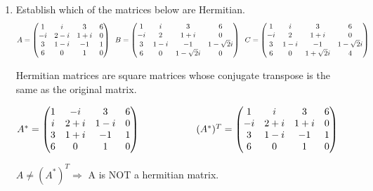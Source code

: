 \documentclass[fleqn]{article}
\begin{document}
\begin{enumerate}
    \item Establish which of the matrices below are Hermitian. $$A = 
      \begin{pmatrix}
        1 & i & 3 & 6 \\
        -i & 2-i & 1+i  & 0 \\
        3 & 1-i & -1 & 1 \\
        6 & 0 & 1 & 0 \\
      \end{pmatrix}\hskip 0.2truecm 
      B=\begin{pmatrix}
        1 & i & 3 & 6 \\
        -i & 2 & 1+i  & 0 \\
        3 & 1-i & -1 & 1-\sqrt{2}i \\
        6 & 0 & 1-\sqrt{2}i & 0 \\
      \end{pmatrix}
      \hskip 0.2truecm 
      C=\begin{pmatrix}
        1 & i & 3 & 6 \\
        -i & 2 & 1+i  & 0 \\
        3 & 1-i & -1 & 1-\sqrt{2}i \\
        6 & 0 & 1+\sqrt{2}i & 4 \\
      \end{pmatrix}
      $$

      \textcolor{hwColor}{Hermitian matrices are square matrices whose conjugate transpose is the same as the original matrix.}

      \textcolor{hwColor}{
        $
        A^*=\begin{pmatrix}
          1 & -i & 3 & 6 \\
          i & 2+i & 1-i & 0 \\
          3 & 1+i & -1 & 1 \\
          6 & 0 & 1 & 0
        \end{pmatrix}
        \hskip 2truecm
        (A^*)^T=\begin{pmatrix}
          1 & i & 3 & 6 \\
          -i & 2+i & 1+i  & 0 \\
          3 & 1-i & -1 & 1 \\
          6 & 0 & 1 & 0 \\
        \end{pmatrix}
        $ 
      }

      \textcolor{hwColor}{$A \ne (A^*)^T\Longrightarrow$ A is NOT a hermitian matrix.}


\end{enumerate}
\end{document}
